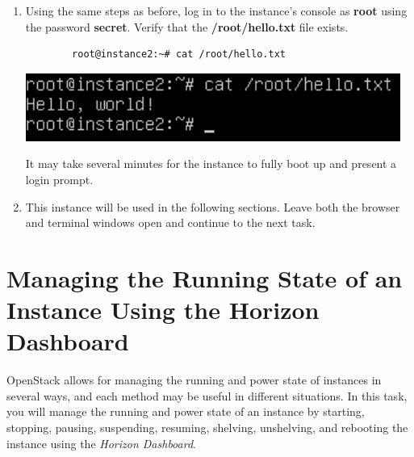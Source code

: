 \documentclass[letterpaper, 12pt]{article}
\begin{document}
\begin{enumerate}
    \item Using the same steps as before, log in to the instance's console as \textbf{root} using the password
    \textbf{secret}. Verify that the \textbf{/root/hello.txt} file exists.
    \begin{lstlisting}
        root@instance2:~# cat /root/hello.txt
    \end{lstlisting}

    \begin{center}
        \includegraphics[width=\linewidth]{images/part2/step15.png}
    \end{center}

    \begin{notebox}
        It may take several minutes for the instance to fully boot up and present a login prompt.
    \end{notebox}

    \item This instance will be used in the following sections. Leave both the browser and terminal windows open and
    continue to the next task.
    
\end{enumerate}


\section{Managing the Running State of an Instance Using the Horizon Dashboard}
\label{sec:managing_the_running_state_of_an_instance_web}
OpenStack allows for managing the running and power state of instances in several ways, and each method may be useful in
different situations. In this task, you will manage the running and power state of an instance by starting, stopping,
pausing, suspending, resuming, shelving, unshelving, and rebooting the instance using the \textit{Horizon Dashboard}.
\end{document}
